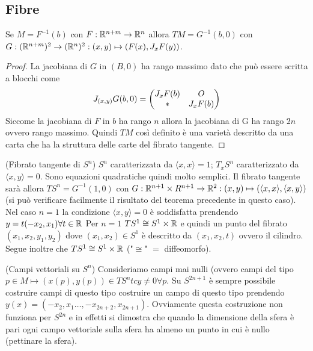 \subsection{Fibre}
\begin{theorem}
    Se $M=F^{-1}(b)$ con $F:\mathbb{R}^{n+m}\to\mathbb{R}^n$ allora
    $TM=G^{-1}(b,0)$ con
    $G:(\mathbb{R}^{n+m})^2\to(\mathbb{R}^n)^2:(x,y)\mapsto(F(x),J_xF(y))$.
\end{theorem}
\begin{proof}
    La jacobiana di $G$ in $(B,0)$ ha rango massimo dato che può
    essere scritta a blocchi come
    \begin{displaymath}
        J_{(x,y)}G(b,0)=\mqty(J_xF(b) & O \\ * & J_xF(b))
    \end{displaymath}
    Siccome la jacobiana di $F$ in $b$ ha rango $n$ allora la
    jacobiana di G ha rango $2n$ ovvero rango massimo. Quindi $TM$
    così definito è una varietà descritto da una carta che ha la
    struttura delle carte del fibrato tangente.
\end{proof}

\begin{ex}(Fibrato tangente di $S^n$)
    $S^n$ caratterizzata da $\langle x,x\rangle=1$; $T_xS^n$
    caratterizzato da $\langle x,y \rangle=0$. Sono equazioni
    quadratiche quindi molto semplici. Il fibrato tangente sarà
    allora $TS^n=G^{-1}(1,0)$ con $G:\mathbb{R}^{n+1}\times R^{n+1}\to\mathbb{R}^2:
    (x,y)\mapsto(\langle x,x \rangle, \langle x,y \rangle)$(si può
    verificare facilmente il risultato del teorema precedente in
    questo caso). \\
    Nel caso $n=1$ la condizione $\langle x,y\rangle=0$ è
    soddisfatta prendendo $y=t(-x_2,x_1)\forall t\in\mathbb{R}$ Per $n=1$
    $TS^1\cong S^1\times\mathbb{R}$ e quindi un punto del fibrato
    $(x_1,x_2,y_1,y_2)$ dove $(x_1,x_2)\in S^1$ è descritto da
    $(x_1,x_2,t)$ ovvero il cilindro. Segue inoltre che
    $TS^1\cong S^1\times\mathbb{R}$ ("$\cong$" $=$ diffeomorfo).
\end{ex}

\begin{ex}(Campi vettoriali su $S^n$)
    Consideriamo campi mai nulli (ovvero campi del tipo $p\in
    M\mapsto (x(p),y(p))\in TS^{n} tc y\neq 0 \forall p$. 
    Su $S^{2n+1}$ è sempre possibile costruire campi di questo tipo
    costruire un campo di questo tipo prendendo
    $y(x)=(-x_2,x_1\dots,-x_{2n+2},x_{2n+1})$. Ovviamente questa
    costruzione non funziona per $S^{2n}$ e in effetti si dimostra
    che quando la dimensione della sfera è pari ogni campo
    vettoriale sulla sfera ha almeno un punto in cui è nullo
    (pettinare la sfera).
\end{ex}
